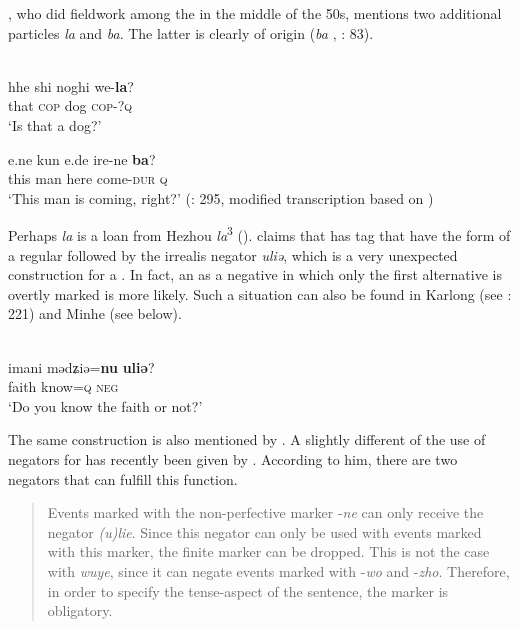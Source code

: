 \citet[295]{Todaeva1959}, who did fieldwork among the  in the middle of the 50s, mentions two additional  particles \textit{la} and \textit{ba}. The latter is clearly of  origin (\textit{ba} , \citealt{LiuZhaoxiong1981}: 83).

\newpage 
\ea%
    \label{ex:mong:49}
    \\
    \ea
    \gll hhe  shi  noghi  we-\textbf{{la}}?\\
    that  \textsc{cop}  dog  \textsc{cop}-?\textsc{q}\\
    \glt ‘Is that a dog?’
    
    \ex
    \gll e.ne  kun  e.de  ire-ne \textbf{{ba}}?\\
    this  man  here  come-\textsc{dur}  \textsc{q}\\
    \glt ‘This man is coming, right?’ (\citealt{Todaeva1959}: 295, modified transcription based on \citealt{Kim2003})
    \z
    \z

Perhaps \textit{la} is a loan from Hezhou  \textit{la}\textsuperscript{3}  (). \citet[360]{Field1997} claims that  has tag  that have the form of a regular  followed by the irrealis negator \textit{uliə}, which is a very unexpected construction for a . In fact, an  as a negative  in which only the first alternative is overtly marked is more likely. Such a situation can also be found in Karlong  (see \citealt{Faehndrich2007}: 221) and Minhe  (see below).

\ea%
    \label{ex:mong:50}
    \\
    \gll imani  mədʑiə=\textbf{{nu}} \textbf{{uliə}}?\\
    faith  know=\textsc{q}  \textsc{neg}\\
    \glt ‘Do you know the faith or not?’ \citep[360]{Field1997}
    \z

\noindent The same construction is also mentioned by \citet[79]{LiuZhaoxiong1981}. A slightly different  of the use of negators for  has recently been given by \citet[41]{Napoli2014}. According to him, there are two negators that can fulfill this function.

\begin{quote}
Events marked with the non-perfective marker -\textit{ne} can only receive the negator \textit{(u)lie}. Since this negator can only be used with events marked with this marker, the finite marker can be dropped. This is not the case with \textit{wuye}, since it can negate events marked with -\textit{wo} and -\textit{zho}. Therefore, in order to specify the tense-aspect of the sentence, the marker is obligatory. 
\end{quote}

